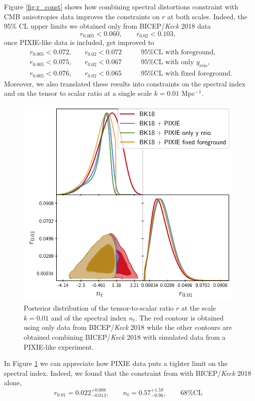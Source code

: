 Figure \ref{fig:r_const} shows how combining spectral distortions constraint with CMB anisotropies data improves the constraints on $r$ at both scales. Indeed, the 95\% CL upper limits we obtained only from BICEP/\textit{Keck} 2018 data
$$r_{0.005}<0.060,\qquad r_{0.02}<0.103,$$
once PIXIE-like data is included, get improved to 
\begin{align*}
    &r_{0.005}<0.072,\quad &r_{0.02}<0.072\qquad&\text{95\%CL with foreground,}\\
    &r_{0.005}<0.075,\quad &r_{0.02}<0.067\qquad&\text{95\%CL with only $y_{\text{reio}}$,}\\
    &r_{0.005}<0.076,\quad &r_{0.02}<0.065\qquad&\text{95\%CL with fixed foreground}.
\end{align*}
Moreover, we also translated these results into constraints on the spectral index and on the tensor to scalar ratio at a single scale $k=0.01$ Mpc$^{-1}$. 
\begin{figure}[t]
        \centering
        \includegraphics[width=.75\textwidth]{Constraints/nt.pdf}
        \caption{Posterior distribution of the tensor-to-scalar ratio $r$ at the scale $k=0.01$ and of the spectral index $n_t$. The red contour is obtained using only data from BICEP/\textit{Keck} 2018 \cite{Ade_2021} while the other contours are obtained combining BICEP/\textit{Keck} 2018 with simulated data from a PIXIE-like experiment.}
        \label{fig:nt_const}        
\end{figure}
In Figure \ref{fig:nt_const} we can appreciate how PIXIE data puts a tighter limit on the spectral index. Indeed, we found that the constraint from with BICEP/\emph{Keck} 2018 alone,
$$r_{0.01}=0.022^{+0.008}_{-0.013} ,\qquad n_t=0.57^{+1.59}_{-0.96},\qquad \text{68\%CL}$$
